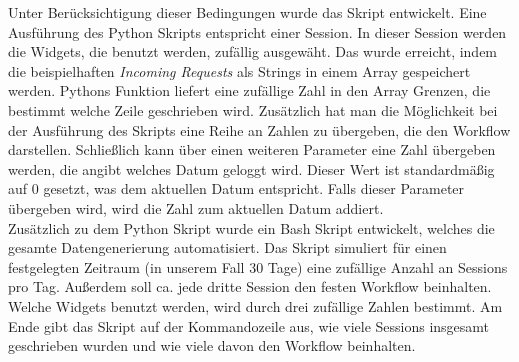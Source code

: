 Unter Berücksichtigung dieser Bedingungen wurde das Skript entwickelt. Eine Ausführung des Python Skripts entspricht einer Session. In dieser Session werden die Widgets, die \glqq benutzt\grqq{} werden, zufällig ausgewäht. Das wurde erreicht, indem die beispielhaften \textit{Incoming Requests} als Strings in einem Array gespeichert werden. Pythons  Funktion liefert eine zufällige Zahl in den Array Grenzen, die bestimmt welche Zeile geschrieben wird. Zusätzlich hat man die Möglichkeit bei der Ausführung des Skripts eine Reihe an Zahlen zu übergeben, die den Workflow darstellen. Schließlich kann über einen weiteren Parameter eine Zahl übergeben werden, die angibt welches Datum geloggt wird. Dieser Wert ist standardmäßig auf 0 gesetzt, was dem aktuellen Datum entspricht. Falls dieser Parameter übergeben wird, wird die Zahl zum aktuellen Datum addiert.\\
Zusätzlich zu dem Python Skript wurde ein Bash Skript entwickelt, welches die gesamte Datengenerierung automatisiert. Das Skript simuliert für einen festgelegten Zeitraum (in unserem Fall 30 Tage) eine zufällige Anzahl an Sessions pro Tag. Außerdem soll ca. jede dritte Session den festen Workflow beinhalten. Welche Widgets benutzt werden, wird durch drei zufällige Zahlen bestimmt. Am Ende gibt das Skript auf der Kommandozeile aus, wie viele Sessions insgesamt geschrieben wurden und wie viele davon den Workflow beinhalten.


